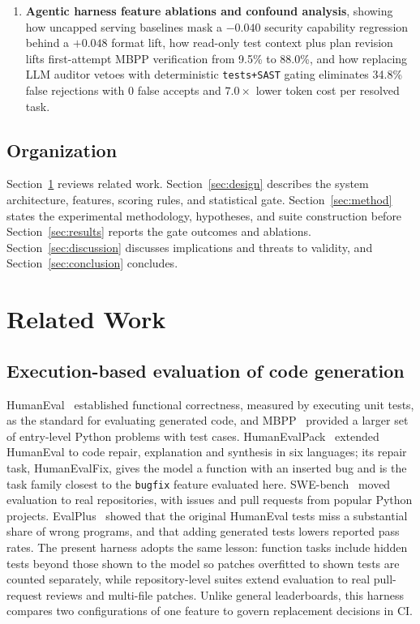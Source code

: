 \documentclass[conference]{IEEEtran}
\begin{document}
\begin{enumerate}
\item \textbf{Agentic harness feature ablations and confound analysis}, showing how uncapped serving baselines mask a $-0.040$ security capability regression behind a $+0.048$ format lift, how read-only test context plus plan revision lifts first-attempt MBPP verification from 9.5\% to 88.0\%, and how replacing LLM auditor vetoes with deterministic \texttt{tests+SAST} gating eliminates 34.8\% false rejections with 0 false accepts and $7.0\times$ lower token cost per resolved task.
\end{enumerate}

\subsection{Organization}
\label{sec:intro-org}

Section~\ref{sec:related} reviews related work. Section~\ref{sec:design} describes the system architecture, features, scoring rules, and statistical gate. Section~\ref{sec:method} states the experimental methodology, hypotheses, and suite construction before Section~\ref{sec:results} reports the gate outcomes and ablations. Section~\ref{sec:discussion} discusses implications and threats to validity, and Section~\ref{sec:conclusion} concludes.

\section{Related Work}
\label{sec:related}

\subsection{Execution-based evaluation of code generation}
\label{sec:related-exec}

HumanEval~\cite{chen2021codex} established functional correctness, measured by executing unit tests, as the standard for evaluating generated code, and MBPP~\cite{austin2021mbpp} provided a larger set of entry-level Python problems with test cases. HumanEvalPack~\cite{muennighoff2024octopack} extended HumanEval to code repair, explanation and synthesis in six languages; its repair task, HumanEvalFix, gives the model a function with an inserted bug and is the task family closest to the \texttt{bugfix} feature evaluated here. SWE-bench~\cite{jimenez2024swebench} moved evaluation to real repositories, with issues and pull requests from popular Python projects. EvalPlus~\cite{liu2023evalplus} showed that the original HumanEval tests miss a substantial share of wrong programs, and that adding generated tests lowers reported pass rates. The present harness adopts the same lesson: function tasks include hidden tests beyond those shown to the model so patches overfitted to shown tests are counted separately, while repository-level suites extend evaluation to real pull-request reviews and multi-file patches. Unlike general leaderboards, this harness compares two configurations of one feature to govern replacement decisions in CI.
\end{document}
